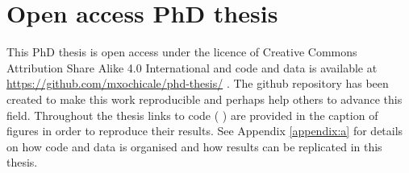 \section{Open access PhD thesis}
This PhD thesis is open access under the licence of   
Creative Commons Attribution Share Alike 4.0 International 
and code and data is available at 
\url{https://github.com/mxochicale/phd-thesis/} \citep{xochicale2018}.
The github repository has been created 
to make this work reproducible 
and perhaps help others to advance this field.
Throughout the thesis links to \R code (\,\codeicon\,) 
are provided in the caption of figures in 
order to reproduce their results.
See Appendix \ref{appendix:a}
for details on how code and data 
is organised and how results can be replicated 
in this thesis. 

